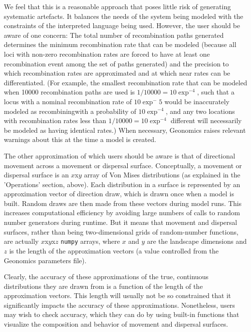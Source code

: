 ﻿\documentclass{article}
\begin{document}
We feel that this is a reasonable approach that poses little risk of generating
systematic artefacts.
It balances the needs of the system being modeled with the constraints
of the interpreted language being used.
However, the user should be aware of one concern:
The total number of recombination paths generated
determines the minimum recombination rate that can be modeled
(because all loci with non-zero recombination rates are forced to have at least
one recombination event among the set of paths generated)
and the precision to which recombination rates are approximated and at which near
rates can be differentiated.
(For example, the smallest recombination rate that can be modeled when 10000 recombination paths
are used is $1/10000=10\exp^{-4}$, such that a locus with a nominal recombination rate of 
$10\exp^-5$ would be inaccurately modeled as recombiningwith a probability of $10\exp^{-4}$,
and any two locations with recombination rates less than $1/10000=10\exp^{-4}$ different
will necessarily be modeled as having identical rates.)
When necessary, Geonomics raises relevant warnings about this at the time a model is created.

The other approximation of which users should be aware
is that of directional movement across a movement or dispersal surface.
Conceptually, a movement or dispersal surface is an $x$x$y$ array of Von Mises distributions
(as explained in the 'Operations' section, above).
Each distribution in a surface is represented by an approximation vector of direction draw, which is
drawn once when a model is built. Random draws are then made from these vectors during model runs.
This increases computational efficiency by avoiding large numbers of calls to
random number generators during runtime.
But it means that movement and dispersal surfaces, rather than being two-dimensional grids
of random-number functions, are actually $x$x$y$x$z$ \texttt{numpy} arrays,
where $x$ and $y$ are the landscape dimensions and $z$ is the length of the
approximation vectors (a value controlled from the Geonomics parameters file).

Clearly, the accuracy of these approximations of the true, continuous distributions they
are drawn from is a function of the length of the approximation vectors.
This length will usually not be so constrained that it significantly impacts
the accuracy of these approximations.
Nonetheless, users may wish to check accuracy, which they can do by using built-in
functions that visualize the composition and behavior of movement and dispersal surfaces.
\end{document}
